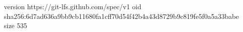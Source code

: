 version https://git-lfs.github.com/spec/v1
oid sha256:6d7ad636a9bb9cb11680fa1cff70d54f42b4a43d8729b9c819fe5f0a5a33babe
size 535
